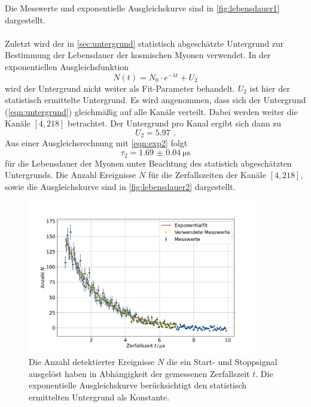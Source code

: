 Die Messwerte und exponentielle Ausgleichskurve sind in \autoref{fig:lebensdauer1} dargestellt.
\\
\\
Zuletzt wird der in \autoref{sec:untergrund} statistisch abgeschätzte Untergrund zur Bestimmung der Lebensdauer der kosmischen Myonen verwendet.
In der exponentiellen Ausgleichsfunktion
\begin{equation}
    N(t) = N_0 \cdot e^{- \lambda t} + U_2
    \label{eqn:exp2}
\end{equation}
wird der Untergrund nicht weiter als Fit-Parameter behandelt.
$U_2$ ist hier der statistisch ermittelte Untergrund.
Es wird angenommen, dass sich der Untergrund (\autoref{eqn:untergrund}) gleichmäßig auf alle Kanäle verteilt.
Dabei werden weiter die Kanäle $[4,218]$ betrachtet.
Der Untergrund pro Kanal ergibt sich dann zu
\begin{equation}
    U_2 = \qty{5.97}{} \, .
\end{equation}
Aus einer Ausgleichsrechnung mit \autoref{eqn:exp2} folgt
\begin{equation}
    \tau_2 = \qty{1.69(4)}{\micro\second}
\end{equation}
für die Lebensdauer der Myonen unter Beachtung des statistich abgeschätzten Untergrunds.
Die Anzahl Ereignisse $N$ für die Zerfallszeiten der Kanäle $[4,218]$, sowie die Ausgleichskurve sind in \autoref{fig:lebensdauer2} dargestellt.
\begin{figure}
    \centering
    \includegraphics[width=0.9\textwidth]{content/plots/lifetime2.pdf}
    \caption{Die Anzahl detektierter Ereignisse $N$ die ein Start- und Stoppsignal ausgelöst haben in Abhängigkeit der gemessenen Zerfallszeit $t$.
    Die exponentielle Ausgleichskurve berücksichtigt den statistisch ermittelten Untergrund als Konstante.
    }
    \label{fig:lebensdauer2}
\end{figure}